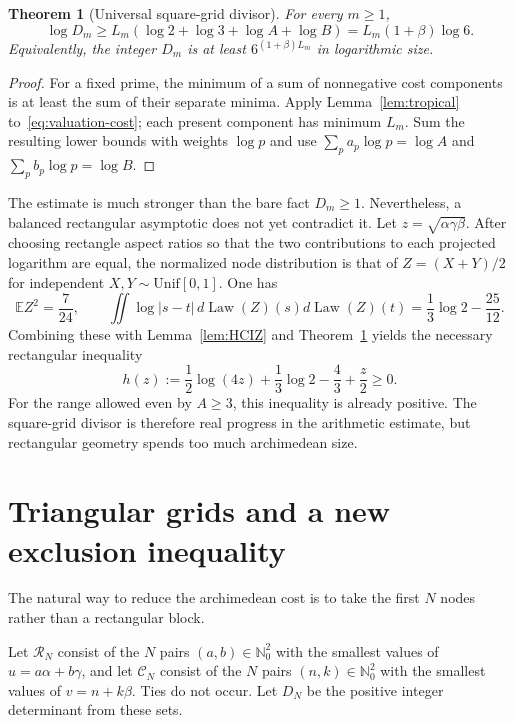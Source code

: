 \documentclass[11pt,oneside]{article}
\newtheorem{theorem}{Theorem}[section]
\theoremstyle{definition}
\theoremstyle{remark}
\newcommand{\Nzero}{\mathbb N_0}
\newcommand{\Law}{\operatorname{Law}}
\newcommand{\E}{\mathbb E}
\begin{document}
\begin{theorem}[Universal square-grid divisor]\label{thm:square-divisor}
For every $m\ge1$,
\begin{equation}\label{eq:square-lower}
 \log D_m\ge L_m(\log2+\log3+\log A+\log B)
 =L_m(1+\beta)\log6.
\end{equation}
Equivalently, the integer $D_m$ is at least
$6^{(1+\beta)L_m}$ in logarithmic size.
\end{theorem}
\begin{proof}
For a fixed prime, the minimum of a sum of nonnegative cost components is at
least the sum of their separate minima.  Apply
Lemma~\ref{lem:tropical} to~\eqref{eq:valuation-cost}; each present component
has minimum $L_m$.  Sum the resulting lower bounds with weights $\log p$ and
use
$\sum_pa_p\log p=\log A$ and
$\sum_pb_p\log p=\log B$.
\end{proof}

The estimate is much stronger than the bare fact $D_m\ge1$.  Nevertheless, a
balanced rectangular asymptotic does not yet contradict it.  Let
$z=\sqrt{\alpha\gamma\beta}$.  After choosing rectangle aspect ratios so that
the two contributions to each projected logarithm are equal, the normalized
node distribution is that of
$Z=(X+Y)/2$ for independent $X,Y\sim\mathrm{Unif}[0,1]$.  One has
\[
 \E Z^2=\frac7{24},\qquad
 \iint\log|s-t|\,d\Law(Z)(s)d\Law(Z)(t)
 =\frac13\log2-\frac{25}{12}.
\]
Combining these with Lemma~\ref{lem:HCIZ} and
Theorem~\ref{thm:square-divisor} yields the necessary rectangular inequality
\begin{equation}\label{eq:rectangle-gap}
 h(z):=\frac12\log(4z)+\frac13\log2-\frac43+\frac z2\ge0.
\end{equation}
For the range allowed even by $A\ge3$, this inequality is already positive.
The square-grid divisor is therefore real progress in the arithmetic estimate,
but rectangular geometry spends too much archimedean size.

\section{Triangular grids and a new exclusion inequality}

The natural way to reduce the archimedean cost is to take the first $N$ nodes
rather than a rectangular block.

Let $\mathcal R_N$ consist of the $N$ pairs $(a,b)\in\Nzero^2$ with the
smallest values of $u=a\alpha+b\gamma$, and let $\mathcal C_N$ consist of the
$N$ pairs $(n,k)\in\Nzero^2$ with the smallest values of $v=n+k\beta$.
Ties do not occur.  Let $D_N$ be the positive integer determinant from these
sets.
\end{document}
